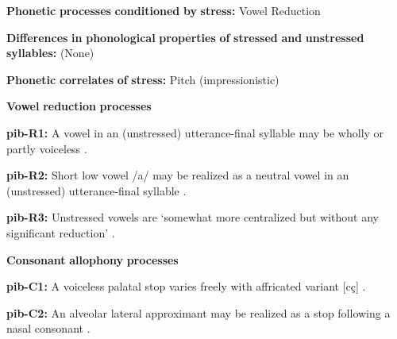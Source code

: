 \documentclass[output=paper]{langsci/langscibook}
\begin{document}
\begin{styleBody}
\textbf{Phonetic} \textbf{processes} \textbf{conditioned} \textbf{by} \textbf{stress:} Vowel Reduction
\end{styleBody}

\begin{styleBody}
\textbf{Differences} \textbf{in} \textbf{phonological} \textbf{properties} \textbf{of} \textbf{stressed} \textbf{and} \textbf{unstressed} \textbf{syllables:} (None)
\end{styleBody}

\begin{styleBody}
\textbf{Phonetic} \textbf{correlates} \textbf{of} \textbf{stress:} Pitch (impressionistic)
\end{styleBody}

\begin{styleBody}
\textbf{Vowel} \textbf{reduction} \textbf{processes}
\end{styleBody}

\begin{styleBody}
\textbf{pib-R1:} A vowel in an (unstressed) utterance-final syllable may be wholly or partly voiceless \citep[23]{Matteson1965}.
\end{styleBody}

\begin{styleBody}
\textbf{pib-R2:} Short low vowel /a/ may be realized as a neutral vowel in an (unstressed) utterance-final syllable \citep[23]{Matteson1965}.
\end{styleBody}

\begin{styleBody}
\textbf{pib-R3:} Unstressed vowels are ‘somewhat more centralized but without any significant reduction’ \citep[16]{Hanson2010}.
\end{styleBody}

\begin{styleBody}
\textbf{Consonant} \textbf{allophony} \textbf{processes}
\end{styleBody}

\begin{styleBody}
\textbf{pib-C1:} A voiceless palatal stop varies freely with affricated variant [cç] \citep[17]{Hanson2010}.
\end{styleBody}

\begin{styleBody}
\textbf{pib-C2:} An alveolar lateral approximant may be realized as a stop following a nasal consonant \citep[24]{Hanson2010}.
\end{styleBody}
\end{document}
